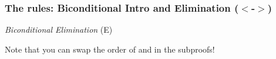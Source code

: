 \begin{frame}
  \frametitle{The rules: Biconditional  Intro and Elimination ($<$-$>$)}
  
\begin{multicols}{2}

\begin{center}
    \begin{fitchproof}
\open
		 
		\ellipsesline
	\close
\breakline
	\open
		 
		\ellipsesline
	\close
    \end{fitchproof}
    \end{center}
   
   \columnbreak
    
\begin{center}
\textit{Biconditional Elimination} (\eiff E) %
    \begin{fitchproof}
	 
\end{fitchproof}

\begin{fitchproof}
	 
\end{fitchproof}
    \end{center}
\end{multicols}

Note that you can swap the order of \metaB{} and \enot\metaB{} in the subproofs! 
\end{frame}















\iffalse

